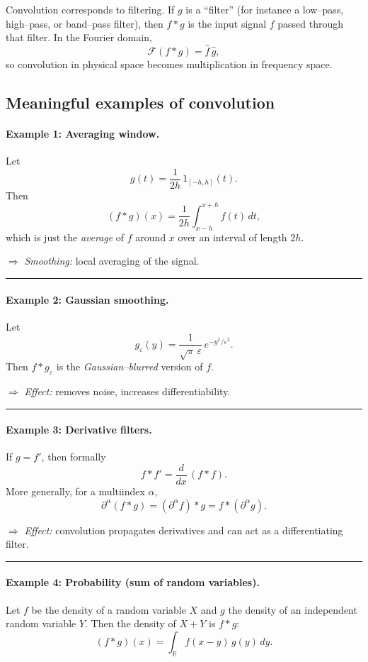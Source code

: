 \documentclass[12pt,a4paper]{article}
\theoremstyle{plain}
\theoremstyle{definition}
\theoremstyle{remark}
\theoremstyle{remark}
\begin{document}
Convolution corresponds to filtering. If $g$ is a ``filter'' (for instance
a low--pass, high--pass, or band--pass filter), then $f*g$ is the input
signal $f$ passed through that filter. In the Fourier domain,
\[
\mathcal{F}(f*g) = \widehat{f}\,\widehat{g},
\]
so convolution in physical space becomes multiplication in frequency space.

\bigskip


\subsection*{Meaningful examples of convolution}

\paragraph*{Example 1: Averaging window.}
Let
\[
g(t) = \frac{1}{2h}\,1_{[-h,h]}(t).
\]
Then
\[
(f*g)(x)
= \frac{1}{2h} \int_{x-h}^{x+h} f(t)\,dt,
\]
which is just the \emph{average} of $f$ around $x$ over an interval of
length $2h$.

\medskip
\noindent$\Rightarrow$ \emph{Smoothing:} local averaging of the signal.

\bigskip\hrule\bigskip

\paragraph*{Example 2: Gaussian smoothing.}
Let
\[
g_\varepsilon(y)
= \frac{1}{\sqrt{\pi}\,\varepsilon}\,e^{-y^2/\varepsilon^2}.
\]
Then $f*g_\varepsilon$ is the \emph{Gaussian--blurred} version of $f$.

\medskip
\noindent$\Rightarrow$ \emph{Effect:} removes noise, increases
differentiability.

\bigskip\hrule\bigskip

\paragraph*{Example 3: Derivative filters.}
If $g = f'$, then formally
\[
f * f'
= \frac{d}{dx}\,(f*f).
\]
More generally, for a multiindex $\alpha$,
\[
\partial^\alpha(f*g)
= (\partial^\alpha f)*g
= f*(\partial^\alpha g).
\]

\medskip
\noindent$\Rightarrow$ \emph{Effect:} convolution propagates derivatives
and can act as a differentiating filter.

\bigskip\hrule\bigskip

\paragraph*{Example 4: Probability (sum of random variables).}
Let $f$ be the density of a random variable $X$ and $g$ the density of an
independent random variable $Y$. Then the density of $X+Y$ is $f*g$:
\[
(f*g)(x)
= \int_{\mathbb{R}} f(x-y)\,g(y)\,dy.
\]
\end{document}
